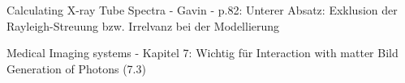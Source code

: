 Calculating X-ray Tube Spectra - Gavin - p.82:
Unterer Absatz: Exklusion der Rayleigh-Streuung bzw. Irrelvanz bei der Modellierung

Medical Imaging systems - Kapitel 7:
Wichtig für Interaction with matter
Bild Generation of Photons (7.3)